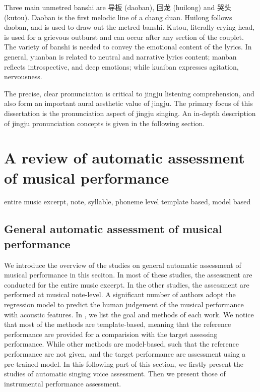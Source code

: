 Three main unmetred banshi are 导板 (daoban), 回龙 (huilong) and 哭头 (kutou). Daoban is the first melodic line of a chang duan. Huilong follows daoban, and is used to draw out the metred banshi. Kutou, literally crying head, is used for a grievous outburst and can occur after any section of the couplet. The variety of banshi is needed to convey the emotional content of the lyrics. In general, yuanban is related to neutral and narrative lyrics content; manban reflects introspective, and deep emotions; while kuaiban expresses agitation, nervousness.

The precise, clear pronunciation is critical to jingju listening comprehension, and also form an important aural aesthetic value of jingju. The primary focus of this dissertation is the pronunciation aspect of jingju singing. An in-depth description of jingju pronunciation concepts is given in the following section.

\section{A review of automatic assessment of musical performance}
entire music excerpt, note, syllable, phoneme level
template based, model based

\subsection{General automatic assessment of musical performance}

We introduce the overview of the studies on general automatic assessment of musical performance in this seciton. In most of these studies, the assessment are conducted for the entire music excerpt. In the other studies, the assessment are performed at musical note-level. A significant number of authors adopt the regression model to predict the human judgement of the musical performance with acoustic features. In , we list the goal and methods of each work. We notice that most of the methods are template-based, meaning that the reference performance are provided for a comparision with the target assessing performance. While other methods are model-based, such that the reference performance are not given, and the target performance are assessment using a pre-trained model. In this following part of this section, we firstly present the studies of automatic singing voice assessment. Then we present those of instrumental performance assessment.

